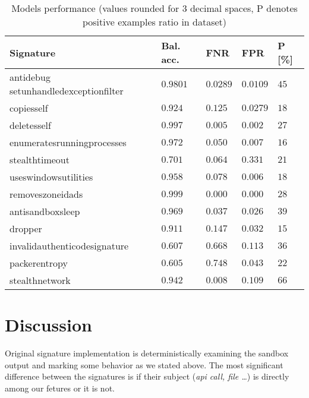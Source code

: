 \begin{table}[h]
  \centering
  \caption{Models performance (values rounded for 3 decimal spaces, P denotes positive examples ratio in dataset)}
  \begin{tabular}{lllll}
      \toprule
      \textbf{Signature} &
      \textbf{Bal. acc.} &
      \textbf{FNR} &
      \textbf{FPR} &
      \textbf{P [\%]}
      \\
      \midrule
      antidebug setunhandledexceptionfilter & $0.9801$ & $0.0289$ & $0.0109$ & $45$ \\
      \midrule
      copiesself & $0.924$ & $0.125$ & $0.0279$ & $18$ \\
      \midrule
      deletesself & $0.997$ & $0.005$ & $0.002$ & $27$ \\
      \midrule
      enumeratesrunningprocesses & $0.972$ & $0.050$ & $0.007$ & $16$ \\
      \midrule
      stealthtimeout & $0.701$ & $0.064$ & $0.331$ & $21$ \\
      \midrule
      useswindowsutilities & $0.958$ & $0.078$ & $0.006$ & $18$ \\
      \midrule
      removeszoneidads & $0.999$ & $0.000$ & $0.000$ & $28$ \\
      \midrule[0.3pt]
      \midrule[0.3pt]
      antisandboxsleep & $0.969$ & $0.037$ & $0.026$ & $39$ \\
      \midrule
      dropper & $0.911$ & $0.147$ & $0.032$ & $15$ \\
      \midrule
      invalidauthenticodesignature & $0.607$ & $0.668$ & $0.113$ & $36$ \\
      \midrule
      packerentropy & $0.605$ & $0.748$ & $0.043$ & $22$ \\
      \midrule
      stealthnetwork & $0.942$ & $0.008$ & $0.109$ & $66$ \\
      \bottomrule
  \end{tabular}
  \label{tab:models_res}
\end{table}

\section{Discussion}
Original signature implementation is deterministically examining the sandbox output and marking some behavior as we stated above. The most significant difference between the signatures is if their subject (\emph{api call, file \dots}) is directly among our fetures or it is not. 

